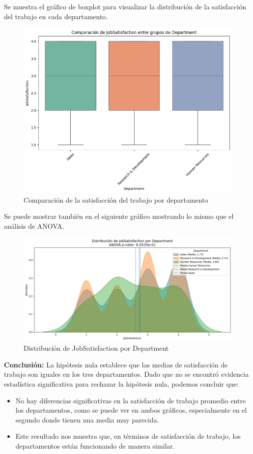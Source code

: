 Se muestra el gráfico de boxplot para visualizar la distribución de la satisfacción del trabajo en cada departamento.

\begin{figure}[H]
    \centering
    \includegraphics[width=1\textwidth]{images/boxplot-eje2.png}
    \caption{Comparación de la satisfacción del trabajo por departamento}
    \label{fig:anova}
\end{figure}


Se puede mostrar también en el siguiente gráfico mostrando lo mismo que el análisis de ANOVA.

\begin{figure}[H]
    \centering
    \includegraphics[width=1\textwidth]{images/sesgado-eje2.png}
    \caption{Distribución de JobSatisfaction por Department}
    \label{fig:anova-sesgado}
\end{figure}


\textbf{Conclusión:}
La hipótesis nula establece que las medias de satisfacción de trabajo son iguales en los tres departamentos. 
Dado que no se encontró evidencia estadística significativa para rechazar la hipótesis nula, podemos concluir que:

\begin{itemize}
    \item No hay diferencias significativas en la satisfacción de trabajo promedio entre los departamentos, 
    como se puede ver en ambos gráficos, especialmente en el segundo donde tienen una media muy parecida.
    \item Este resultado nos muestra que, en términos de satisfacción de trabajo, los departamentos están funcionando de manera similar.
\end{itemize}